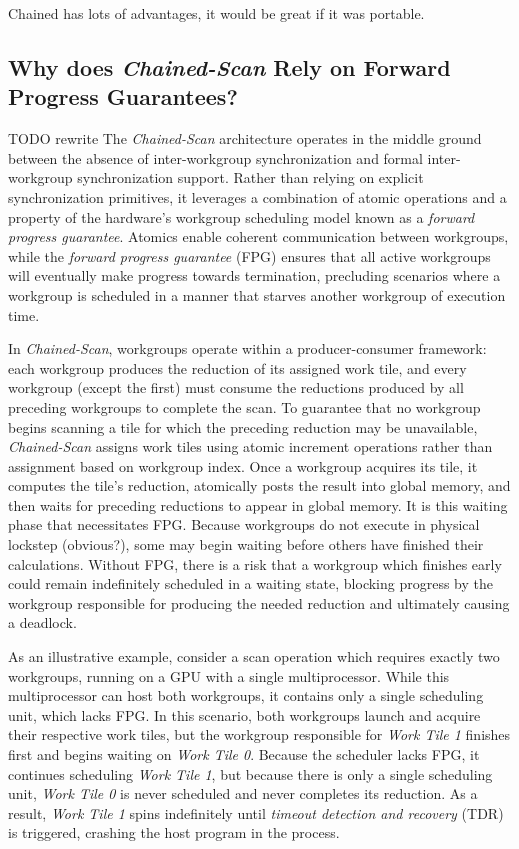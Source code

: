 \documentclass[sigconf]{acmart}
\begin{document}
Chained has lots of advantages, it would be great if it was portable.

\subsection{Why does \emph{Chained-Scan} Rely on Forward Progress Guarantees?}
TODO rewrite
The \emph{Chained-Scan} architecture operates in the middle ground between the absence of inter-workgroup synchronization and formal inter-workgroup synchronization support. Rather than relying on explicit synchronization primitives, it leverages a combination of atomic operations and a property of the hardware's workgroup scheduling model known as a \emph{forward progress guarantee}. Atomics enable coherent communication between workgroups, while the \emph{forward progress guarantee} (FPG) ensures that all active workgroups will eventually make progress towards termination, precluding scenarios where a workgroup is scheduled in a manner that starves another workgroup of execution time.

In \emph{Chained-Scan}, workgroups operate within a producer-consumer framework: each workgroup produces the reduction of its assigned work tile, and every workgroup (except the first) must consume the reductions produced by all preceding workgroups to complete the scan. To guarantee that no workgroup begins scanning a tile for which the preceding reduction may be unavailable, \emph{Chained-Scan} assigns work tiles using atomic increment operations rather than assignment based on workgroup index. Once a workgroup acquires its tile, it computes the tile’s reduction, atomically posts the result into global memory, and then waits for preceding reductions to appear in global memory. It is this waiting phase that necessitates FPG. Because workgroups do not execute in physical lockstep (obvious?), some may begin waiting before others have finished their calculations. Without FPG, there is a risk that a workgroup which finishes early could remain indefinitely scheduled in a waiting state, blocking progress by the workgroup responsible for producing the needed reduction and ultimately causing a deadlock.

As an illustrative example, consider a scan operation which requires exactly two workgroups, running on a GPU with a single multiprocessor. While this multiprocessor can host both workgroups, it contains only a single scheduling unit, which lacks FPG. In this scenario, both workgroups launch and acquire their respective work tiles, but the workgroup responsible for \emph{Work Tile 1} finishes first and begins waiting on \emph{Work Tile 0}. Because the scheduler lacks FPG, it continues scheduling \emph{Work Tile 1}, but because there is only a single scheduling unit, \emph{Work Tile 0} is never scheduled and never completes its reduction. As a result, \emph{Work Tile 1} spins indefinitely until \emph{timeout detection and recovery} (TDR) is triggered, crashing the host program in the process.
\end{document}
